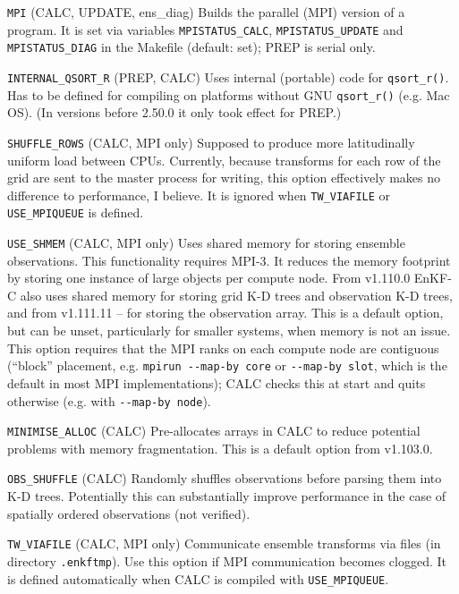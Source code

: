 \documentclass[11pt]{report}
\begin{document}
\begin{description}
\item{\verb|MPI|} (CALC, UPDATE, ens\_diag)
  Builds the parallel (MPI) version of a program.
  It is set via variables \verb|MPISTATUS_CALC|, \verb|MPISTATUS_UPDATE| and \verb|MPISTATUS_DIAG| in the Makefile (default: set); PREP is serial only.
\item{\verb|INTERNAL_QSORT_R|} (PREP, CALC)
  Uses internal (portable) code for \verb|qsort_r()|.
  Has to be defined for compiling on platforms without GNU \verb|qsort_r()| (e.g. Mac OS).
  (In versions before 2.50.0 it only took effect for PREP.)
\item{\verb|SHUFFLE_ROWS|} (CALC, MPI only)
  Supposed to produce more latitudinally uniform load between CPUs.
  Currently, because transforms for each row of the grid are sent to the master process for writing, this option effectively makes no difference to performance, I believe.
  It is ignored when \verb|TW_VIAFILE| or \verb|USE_MPIQUEUE| is defined.
\item{\verb|USE_SHMEM|} (CALC, MPI only)
  Uses shared memory for storing ensemble observations.
  This functionality requires MPI-3.
  It reduces the memory footprint by storing one instance of large objects per compute node.
  From v1.110.0 EnKF-C also uses shared memory for storing grid K-D trees and observation K-D trees, and from v1.111.11 -- for storing the observation array.
  This is a default option, but can be unset, particularly for smaller systems, when memory is not an issue.
  This option requires that the MPI ranks on each compute node are contiguous (``block'' placement, e.g. \verb|mpirun --map-by core| or \verb|--map-by slot|, which is the default in most MPI implementations); CALC checks this at start and quits otherwise (e.g. with \verb|--map-by node|).
\item{\verb|MINIMISE_ALLOC|} (CALC)
  Pre-allocates arrays in CALC to reduce potential problems with memory fragmentation.
  This is a default option from v1.103.0.
\item{\verb|OBS_SHUFFLE|} (CALC)
  Randomly shuffles observations before parsing them into K-D trees.
  Potentially this can substantially improve performance in the case of spatially ordered observations (not verified).
\item{\verb|TW_VIAFILE|} (CALC, MPI only)
  Communicate ensemble transforms via files (in directory \verb|.enkftmp|).
  Use this option if MPI communication becomes clogged.
  It is defined automatically when CALC is compiled with \verb|USE_MPIQUEUE|.

\end{description}
\end{document}
